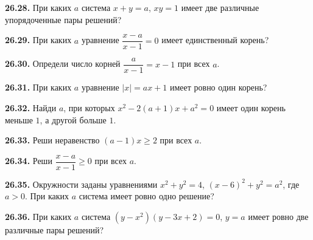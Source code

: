 \noindent\begin{minipage}[t]{\linewidth}\textbf{26.28.}\starmark{} При каких \(a\) система \(x+y=a\), \(xy=1\) имеет две различные упорядоченные пары решений?\par\end{minipage}\par
\noindent\begin{minipage}[t]{\linewidth}\textbf{26.29.} При каких \(a\) уравнение \(\dfrac{x-a}{x-1}=0\) имеет единственный корень?\par\end{minipage}\par
\noindent\begin{minipage}[t]{\linewidth}\textbf{26.30.}\starmark{} Определи число корней \(\dfrac a{x-1}=x-1\) при всех \(a\).\par\end{minipage}\par
\noindent\begin{minipage}[t]{\linewidth}\textbf{26.31.}\starmark{} При каких \(a\) уравнение \(|x|=ax+1\) имеет ровно один корень?\par\end{minipage}\par
\noindent\begin{minipage}[t]{\linewidth}\textbf{26.32.}\starmark{} Найди \(a\), при которых \(x^2-2(a+1)x+a^2=0\) имеет один корень меньше \(1\), а другой больше \(1\).\par\end{minipage}\par
\noindent\begin{minipage}[t]{\linewidth}\textbf{26.33.} Реши неравенство \((a-1)x\geq2\) при всех \(a\).\par\end{minipage}\par
\noindent\begin{minipage}[t]{\linewidth}\textbf{26.34.}\starmark{} Реши \(\dfrac{x-a}{x-1}\geq0\) при всех \(a\).\par\end{minipage}\par
\noindent\begin{minipage}[t]{\linewidth}\textbf{26.35.}\starmark{} Окружности заданы уравнениями \(x^2+y^2=4\), \((x-6)^2+y^2=a^2\), где \(a>0\). При каких \(a\) система имеет ровно одно решение?\par\end{minipage}\par
\noindent\begin{minipage}[t]{\linewidth}\textbf{26.36.}\starmark{} При каких \(a\) система \((y-x^2)(y-3x+2)=0\), \(y=a\) имеет ровно две различные пары решений?\par\end{minipage}\par

